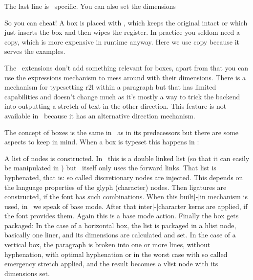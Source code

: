 The last line is \CONTEXT\ specific. You can also set the dimensions

\starttyping
\wd\scratchbox 10cm
\ht\scratchbox 10mm
\dp\scratchbox  5mm
\stoptyping

So you can cheat! A box is placed with \type {\copy}, which keeps the original
intact or \type {\box} which just inserts the box and then wipes the register. In
practice you seldom need a copy, which is more expensive in runtime anyway. Here
we use copy because it serves the examples.

\starttyping
\copy\scratchbox
\box \scratchbox
\stoptyping

\stopsectionlevel

\startsectionlevel[title={\ETEX\ primitives}]

The \ETEX\ extensions don't add something relevant for boxes, apart from that you
can use the expressions mechanism to mess around with their dimensions. There is
a mechanism for typesetting r2l within a paragraph but that has limited
capabilities and doesn't change much as it's mostly a way to trick the backend
into outputting a stretch of text in the other direction. This feature is not
available in \LUATEX\ because it has an alternative direction mechanism.

\stopsectionlevel

\startsectionlevel[title={\LUATEX\ primitives}]

The concept of boxes is the same in \LUATEX\ as in its predecessors but there are
some aspects to keep in mind. When a box is typeset this happens in \LUATEX:

\startitemize[n]
    \startitem
        A list of nodes is constructed. In \LUATEX\ this is a double linked
        list (so that it can easily be manipulated in \LUA) but \TEX\ itself
        only uses the forward links.
    \stopitem
    \startitem
        That list is hyphenated, that is: so called discretionary nodes are
        injected. This depends on the language properties of the glyph
        (character) nodes.
    \stopitem
    \startitem
        Then ligatures are constructed, if the font has such combinations. When
        this built|-|in mechanism is used, in \CONTEXT\ we speak of base mode.
    \stopitem
    \startitem
        After that inter|-|character kerns are applied, if the font provides
        them. Again this is a base mode action.
    \stopitem
    \startitem
        Finally the box gets packaged:
        \startitemize
            \startitem
                In the case of a horizontal box, the list is packaged in a
                hlist node, basically one liner, and its dimensions are calculated
                and set.
            \stopitem
            \startitem
                In the case of a vertical box, the paragraph is broken into one
                or more lines, without hyphenation, with optimal hyphenation or
                in the worst case with so called emergency stretch applied, and
                the result becomes a vlist node with its dimensions set.
            \stopitem
        \stopitemize
    \stopitem
\stopitemize

